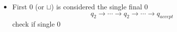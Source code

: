 \begin{frame}[allowframebreaks]
\begin{itemize}
\item First 0 (or $\sqcup$) is considered the single
final 0 
\begin{equation*}
q_2 \rightarrow \cdots
\rightarrow q_2 \rightarrow \cdots \rightarrow
q_{accept}
\end{equation*}
check if single 0



\end{itemize}\end{frame}




